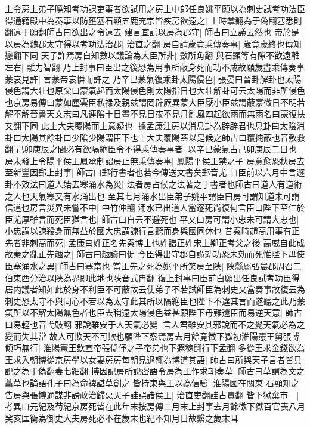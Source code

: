 上令房上弟子曉知考功課吏事者欲試用之房上中郎任良姚平願以為刺史試考功法臣得通籍殿中為奏事以防壅塞石顯五鹿充宗皆疾房欲遠之|{
	上時掌翻為于偽翻塞悉則翻遠于願翻師古曰欲出之令遠去}
建言宜試以房為郡守|{
	師古曰立議云然也}
帝於是以房為魏郡太守得以考功法治郡|{
	治直之翻}
房自請歲竟乘傳奏事|{
	歲竟歲終也傳知戀翻下同}
天子許焉房自知數以議論為大臣所非|{
	數所角翻}
與石顯等有隙不欲遠離左右|{
	離力智翻}
乃上封事曰臣出之後恐為用事所蔽身死而功不成故願歲盡乘傳奏事蒙哀見許|{
	言蒙帝哀憐而許之}
乃辛巳蒙氣復乘卦太陽侵色|{
	張晏曰晉卦解卦也太陽侵色謂大壮也原父曰蒙氣起而太陽侵色則太陽指日也大壮解卦可云太陽而非所侵色也京房易傳曰蒙如塵雲臣私禄及親兹謂罔辟厥異蒙大臣厭小臣兹謂蔽蒙微日不明若解不解晉書天文志曰凡連隂十日晝不見日夜不見月亂風四起欲雨而無雨名曰蒙復扶又翻下同}
此上大夫覆陽而上意疑也|{
	據孟康注房以消息卦為辟辟君也息卦曰太陰消卦曰太陽其餘卦曰少隂少陽謂臣下也上大夫覆陽蓋以是候之師古曰覆掩蔽也音敷救翻}
己卯庚辰之間必有欲隔絶臣令不得乘傳奏事者|{
	以辛巳蒙氣占己卯庚辰二日也}
房未發上令陽平侯王鳳承制詔房止無乘傳奏事|{
	鳳陽平侯王禁之子}
房意愈恐秋房去至新豐因郵上封事|{
	師古曰郵行書者也若今傳送文書矣郵音尤}
曰臣前以六月中言遯卦不效法曰道人始去寒涌水為災|{
	法者房占候之法著之于書者也師古曰道人有道術之人也天氣寒又有水涌出也}
至其七月涌水出臣弟子姚平謂臣曰房可謂知道未可謂信道也房言災異未嘗不中|{
	中竹仲翻}
涌水已出道人當逐死尚復何言臣曰陛下至仁於臣尤厚雖言而死臣猶言也|{
	師古曰自云不避死也}
平又曰房可謂小忠未可謂大忠也|{
	小忠謂以諫殺身而無益於國大忠謂諫行言聽而身與國同休也}
昔秦時趙高用事有正先者非刺高而死|{
	孟康曰姓正名先秦博士也姓譜正姓宋上卿正考父之後}
高威自此成故秦之亂正先趣之|{
	師古曰趣讀曰促}
今臣得出守郡自詭効功恐未効而死惟陛下毋使臣塞涌水之異|{
	師古曰塞當也}
當正先之死為姚平所笑房至陕|{
	陕縣屬弘農郡周召二伯東西分治以陕為界即此地也陕音式冉翻}
復上封事曰臣前白願出任良試考功臣得居内議者知如此於身不利臣不可蔽故云使弟子不若試師臣為刺史又當奏事故復云為刺史恐太守不與同心不若以為太守此其所以隔絶臣也陛下不違其言而遂聽之此乃蒙氣所以不解太陽無色者也臣去稍遠太陽侵色益甚願陛下毋難還臣而易逆天意|{
	師古曰易輕也音弋豉翻}
邪說雖安于人天氣必變|{
	言人君雖安其邪說而不之覺天氣必為之變而失其常}
故人可欺天不可欺也願陛下察焉房去月餘竟徵下獄初淮陽憲王舅張博傾巧無行|{
	淮陽憲王欽宣帝張偼伃之子帝弟也下遐稼翻行下孟翻}
多從王求金錢欲為王求入朝博從京房學以女妻房房每朝見退輒為博道其語|{
	師古曰所與天子言者皆具說之為于偽翻妻七細翻}
博因記房所說密語令房為王作求朝奏草|{
	師古曰草謂為文之藁草也論語孔子曰為命禆諶草創之}
皆持東與王以為信驗|{
	淮陽國在關東}
石顯知之告房與張博通謀非謗政治歸惡天子詿誤諸侯王|{
	治直吏翻詿古賣翻}
皆下獄棄市　|{
	考異曰元紀及荀紀京房死皆在此年末按房傳二月末上封事去月餘徵下獄百官表八月癸亥匡衡為御史大夫房死必不在歲末也紀不知月日故繫之歲末耳}
